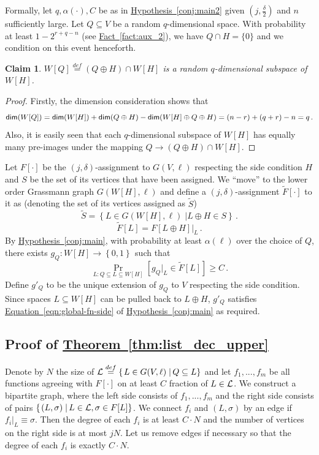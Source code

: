 \documentclass[11pt]{article}
\numberwithin{equation}{section}
\newtheorem{claim}[theorem]{Claim}
\theoremstyle{definition}
\theoremstyle{plain}
\newcommand{\expref}[2]{\hyperref[#2]{#1~\ref{#2}}}
\newcommand{\expeqref}[2]{\hyperref[#2]{#1~\eqref{#2}}}
\newcommand\sett[2]{\left\{ \left. #1 \;\right\vert #2 \right\}}
\newcommand\set[1]{{\left\{ #1 \right\}}}
\newcommand\Prob[2]{{\Pr_{#1}\left[ {#2} \right]}}
\newcommand\power[1]{\set{0,1}^{#1}}
\newcommand\defeq{\stackrel{def}{=}}
\newcommand*\xor{\mathbin{\oplus}}
\newcommand*\dimm{{\sf dim}}
\begin{document}
Formally, let $q,\alpha(\cdot),C$ be as in \expref{Hypothesis}{conj:main2} given $(j, \frac{\delta}{2})$ and $n$ sufficiently large.
Let $Q \subseteq V$ be a random $q$-dimensional space. With probability at least $1-2^{r+q-n}$ (see \expref{Fact}{fact:aux_2}), we have $Q \cap H = \{0\}$ and we condition
on this event henceforth.
\begin{claim}
$W[Q] \defeq (Q\xor H)\cap W[H]$ is a random $q$-dimensional subspace of $W[H]$.
\end{claim}
\begin{proof} Firstly, the dimension consideration shows that
\[
\dimm(W[Q]) = \dimm(W[H])+\dimm(Q\xor H) - \dimm(W[H]\xor Q\xor H) = (n-r) + (q+r) - n = q\,.%
\]
Also, it is easily seen that each $q$-dimensional subspace of $W[H]$ has equally many
pre-images under the mapping $Q\to (Q\xor H)\cap W[H]$.
\end{proof}
Let $F[\cdot]$ be the $(j,\delta)$-assignment to $G(V,\ell)$ respecting the side condition $H$ and $S$ be the set of its vertices that have been assigned.
 We ``move'' to the lower order Grassmann graph $G(W[H], \ell)$ and define a
$(j,\delta)$-assignment $\tilde{F}[\cdot]$  to it as (denoting the set of its vertices assigned as $\tilde{S}$)
\[
\tilde{S} = \sett{L\in G(W[H],\ell)}{L\xor H\in S}\,.%
\]
\[
\tilde{F}[L] = F[L\xor H]|_{L}\,.%
\]
By \expref{Hypothesis}{conj:main}, with probability at least $\alpha(\ell)$ over the choice of $Q$, there exists
$g_{Q}\colon W[H]\to\power{}$ such that
\[
  \Prob{L: Q\subseteq L \subseteq W[H]}{g_{Q}|_{L}\in \tilde{F}[L]}\geqslant C\,.%
\]
Define $g'_Q$ to be the unique extension of $g_{Q}$ to $V$ respecting the side condition. Since spaces $L \subseteq W[H]$ can be
pulled back to $L \xor H$, $g'_Q$ satisfies \expeqref{Equation}{eqn:global-fn-side} of \expref{Hypothesis}{conj:main} as required.

\subsection{Proof of \expref{Theorem}{thm:list_dec_upper}}\label{appendix:list_dec_upper}
Denote by $N$ the size of ${\cal L} \defeq \sett{L\in G(V,\ell)}{Q\subseteq L}$
and let $f_1,...,f_m$ be all functions
agreeing with $F[\cdot]$ on at least $C$ fraction of $L \in {\cal L}$. We construct a bipartite graph, where the left side
consists of $f_1,...,f_m$ and the right side consists of pairs $\sett{(L,\sigma)}{L\in {\cal L}, \sigma\in F[L]}$. We connect $f_i$
and $(L,\sigma)$ by an edge if ${f_i}|_L\equiv \sigma$. Then the degree of each $f_i$ is at least $C\cdot N$ and the number
of vertices on the right side is at most $j N$. Let us remove edges if necessary so that the degree of each
$f_i$ is exactly $C\cdot N$.
\end{document}
